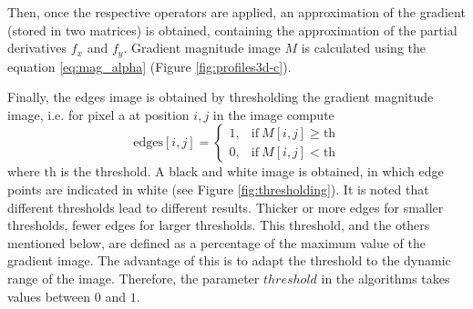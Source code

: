 \documentclass{ipol}
\numberwithin{equation}{section}
\numberwithin{table}{section}
\begin{document}
Then, once the respective operators are applied, an approximation of the gradient (stored in two matrices) 
is obtained, containing the approximation of the partial derivatives $f_x$ and $f_y$. Gradient magnitude 
image $M$ is calculated using the equation \ref{eq:mag_alpha} (Figure \ref{fig:profiles3d-c}). 

Finally, the edges image is obtained by thresholding the gradient magnitude image, i.e. for pixel a at position $i,j$ in the image compute
\begin{equation*}
	\mbox{edges}[i,j] = \begin{cases} 1,& \mbox{if}\ M[i,j]\geq\mbox{th} \\
									0,& \mbox{if}\ M[i,j]<\mbox{th}
					  \end{cases}
\end{equation*}
where $\mbox{th}$ is the threshold. A black and white image is obtained, in which edge points are indicated in white (see Figure \ref{fig:thresholding}). 
It is noted that different thresholds lead to different results. Thicker or more edges for smaller thresholds, fewer edges 
for larger thresholds. This threshold, and the others mentioned below, are defined as a percentage of the maximum value 
of the gradient image. The advantage of this is to adapt the threshold to the dynamic range of the image. 
Therefore, the parameter $threshold$ in the algorithms takes values ​​between $0$ and $1$.
\end{document}
